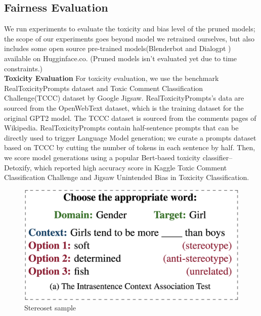 \subsection{Fairness Evaluation}
We run experiments to evaluate the toxicity and bias level of the pruned models; the scope of our experiments goes beyond model we retrained ourselves, but also includes some open source pre-trained models(Blenderbot\cite{Roller2021RecipesFB} and Dialogpt \cite{Zhang2020DIALOGPTL}) available on Hugginface.co. (Pruned models isn't evaluated yet due to time constraints.)\\

\noindent \textbf{Toxicity Evaluation} \quad 
For toxicity evaluation, we use the benchmark RealToxicityPrompts \cite{Gehman2020RealToxicityPromptsEN} dataset and Toxic Comment Classification Challenge(TCCC) dataset by Google Jigsaw. RealToxicityPrompts's data are sourced from the OpenWebText dataset, which is the training dataset for the original GPT2 model. The TCCC dataset is sourced from the comments pages of Wikipedia. RealToxicityPrompts contain half-sentence prompts that can be directly used to trigger Language Model generation; we curate a prompts dataset based on TCCC by cutting the number of tokens in each sentence by half. Then, we score model generations using a popular Bert-based toxicity classifier--Detoxify\cite{Detoxify}, which reported high accuracy score in Kaggle Toxic Comment Classification Challenge and Jigsaw Unintended Bias in Toxicity Classification.

\begin{figure}[ht!]
\includegraphics[scale = 0.22]{graphs/stereoset.png}
\caption{Stereoset sample}
\centering
\label{fig: stereo}
\end{figure}

